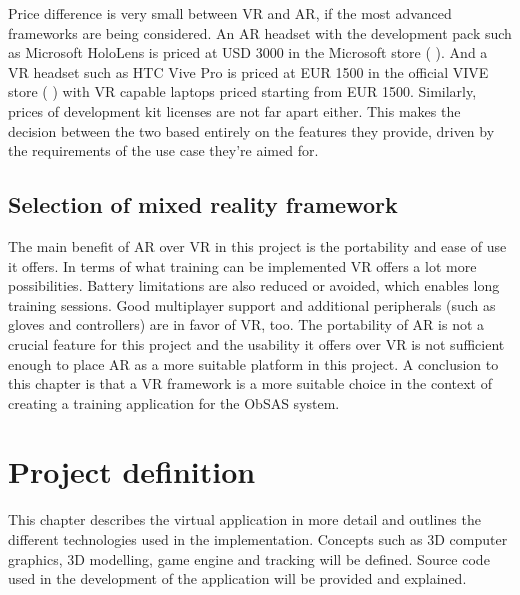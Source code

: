 \documentclass[12pt, a4paper,oneside, nocenter]{thesis}
\newcommand{\citeyeartitlexamkinline}[1]{(\usebibentry{#1}{title} \citeyear{#1})}
\begin{document}
\par
Price difference is very small between VR and AR, if the most advanced frameworks are being considered. An AR headset with the development pack such as Microsoft HoloLens is priced at USD 3000 in the Microsoft store \citeyeartitlexamkinline{hololens-price}. And a VR headset such as HTC Vive Pro is priced at EUR 1500 in the official VIVE store \citeyeartitlexamkinline{htc-vive-pro} with VR capable laptops priced starting from EUR 1500. Similarly, prices of development kit licenses are not far apart either. This makes the decision between the two based entirely on the features they provide, driven by the requirements of the use case they're aimed for.
\par
\section{Selection of mixed reality framework}
The main benefit of AR over VR in this project is the portability and ease of use it offers. In terms of what training can be implemented VR offers a lot more possibilities. Battery limitations are also reduced or avoided, which enables long training sessions. Good multiplayer support and additional peripherals (such as gloves and controllers) are in favor of VR, too. The portability of AR is not a crucial feature for this project and the usability it offers over VR is not sufficient enough to place AR as a more suitable platform in this project. A conclusion to this chapter is that a VR framework is a more suitable choice in the context of creating a training application for the ObSAS system.
\par
\chapter{\texorpdfstring{Project definition}{proj-def}}
This chapter describes the virtual application in more detail and outlines the different technologies used in the implementation. Concepts such as 3D computer graphics, 3D modelling, game engine and tracking will be defined. Source code used in the development of the application will be provided and explained.
\par
\end{document}
